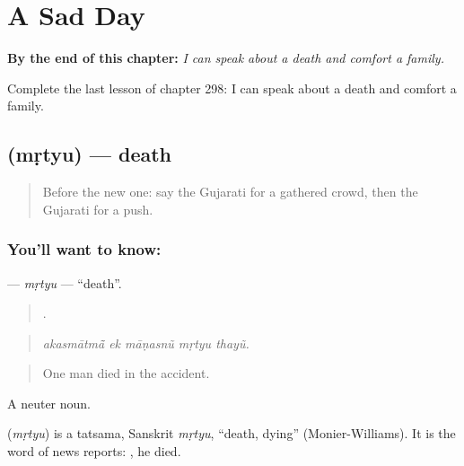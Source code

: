 
\chapter{A Sad Day}
\label{ch:gu-a-sad-day}

\begin{chapteropening}
\textbf{By the end of this chapter:} \emph{I can speak about a death and comfort a family.}

Complete the last lesson of chapter 298: I can speak about a death and comfort a family.
\end{chapteropening}

\section[\texorpdfstring{\gu{મૃત્યુ} (mṛtyu)}{મૃત્યુ (mṛtyu)}]{ (mṛtyu) — death}

\label{lesson:GU-C298-mrtyu}



\begin{quote}
Before the new one: say the Gujarati for a gathered crowd, then the Gujarati for a push.
\end{quote}

\subsection*{You'll want to know: }
\textbf{} — \emph{mṛtyu} — \textquotedblleft{}death\textquotedblright{}.

\begin{quote}
    .
\end{quote}

\begin{quote}
\emph{akasmātmā̃ ek māṇasnũ mṛtyu thayũ.}
\end{quote}

\begin{quote}
One man died in the accident.
\end{quote}

A neuter noun.

\begin{cousinweb}
\textbf{} (\emph{mṛtyu}) is a tatsama, Sanskrit \emph{mṛtyu}, \textquotedblleft{}death, dying\textquotedblright{} (Monier-Williams). It is the word of news reports: \textbf{  }, he died.
\end{cousinweb}

